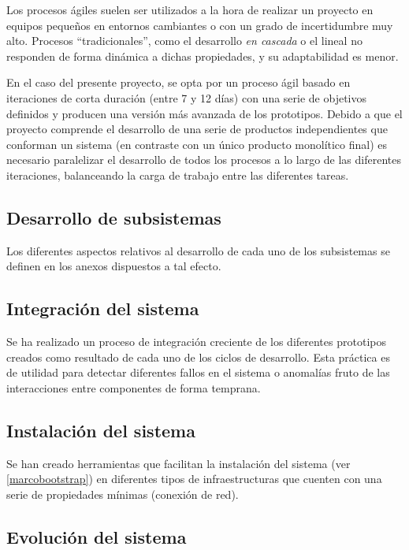 Los procesos ágiles suelen ser utilizados a la hora de realizar un proyecto en equipos pequeños en entornos cambiantes o con un grado de incertidumbre muy alto. Procesos ``tradicionales'', como el desarrollo \textit{en cascada} o el lineal no responden de forma dinámica a dichas propiedades, y su adaptabilidad es menor.

En el caso del presente proyecto, se opta por un proceso ágil basado en iteraciones de corta duración (entre 7 y 12 días) con una serie de objetivos definidos y producen una versión más avanzada de los prototipos. Debido a que el proyecto comprende el desarrollo de una serie de productos independientes que conforman un sistema (en contraste con un único producto monolítico final) es necesario paralelizar el desarrollo de todos los procesos a lo largo de las diferentes iteraciones, balanceando la carga de trabajo entre las diferentes tareas.

\subsection{Desarrollo de subsistemas}
Los diferentes aspectos relativos al desarrollo de cada uno de los subsistemas se definen en los anexos dispuestos a tal efecto.

\subsection{Integración del sistema}

Se ha realizado un proceso de integración creciente de los diferentes prototipos creados como resultado de cada uno de los ciclos de desarrollo. Esta práctica es de utilidad para detectar diferentes fallos en el sistema o anomalías fruto de las interacciones entre componentes de forma temprana.

\subsection{Instalación del sistema}

Se han creado herramientas que facilitan la instalación del sistema (ver \ref{marcobootstrap}) en diferentes tipos de infraestructuras que cuenten con una serie de propiedades mínimas (conexión de red).
\subsection{Evolución del sistema}

